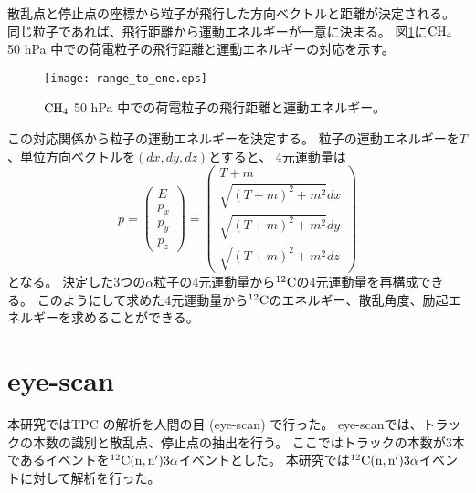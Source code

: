\documentclass[../master]{subfiles}
\begin{document}
散乱点と停止点の座標から粒子が飛行した方向ベクトルと距離が決定される。
同じ粒子であれば、飛行距離から運動エネルギーが一意に決まる。
図\ref{fig::range_to_ene_alpha}に$\rm CH_{4}$ 50 hPa 中での荷電粒子の飛行距離と運動エネルギーの対応を示す。
\begin{figure}
  \centering
  \texttt{[image: range\_to\_ene.eps]}
  \caption[$\rm CH_{4}$ 50 hPa 中での荷電粒子の飛行距離と運動エネルギー。]
          {$\rm CH_{4}$ 50 hPa 中での荷電粒子の飛行距離と運動エネルギー。
          }
  \label{fig::range_to_ene_alpha}
\end{figure}
この対応関係から粒子の運動エネルギーを決定する。
粒子の運動エネルギーを$T$、単位方向ベクトルを$(dx, dy, dz)$とすると、
4元運動量は
\begin{equation}
  p =
  \begin{pmatrix}
    E \\ p_{x} \\ p_{y} \\ p_{z}
  \end{pmatrix}
  =
  \begin{pmatrix}
    T + m \\ \sqrt{(T+m)^2 + m^2} dx \\ \sqrt{(T+m)^2 + m^2} dy \\ \sqrt{(T+m)^2 + m^2} dz
  \end{pmatrix}
  \label{eq::momentum_vector}
\end{equation}
となる。
決定した3つの$\alpha$粒子の4元運動量から${}^{12}{\rm C}$の4元運動量を再構成できる。
このようにして求めた4元運動量から${}^{12}{\rm C}$のエネルギー、散乱角度、励起エネルギーを求めることができる。


\section{eye-scan}
本研究ではTPC の解析を人間の目 (eye-scan) で行った。
eye-scanでは、トラックの本数の識別と散乱点、停止点の抽出を行う。
ここではトラックの本数が3本であるイベントを${}^{12}{\rm C}({\rm n},{\rm n}')3\alpha$イベントとした。
本研究では${}^{12}{\rm C}({\rm n},{\rm n}')3\alpha$イベントに対して解析を行った。
\end{document}
